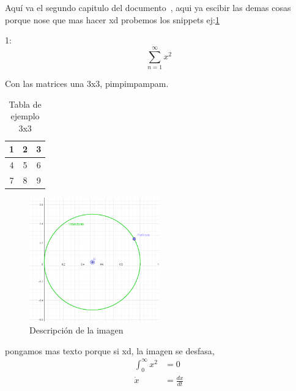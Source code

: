 Aquí va el segundo capitulo del documento~\cite{martin1988estudio}, aqui ya escibir las demas cosas porque nose que mas hacer xd 
probemos los snippets ej:\ref{tab:ejemplo_3x3} 

1:
\begin{equation}
    \sum_{n = 1}^{\infty} x^2 
\end{equation}


Con las matrices una 3x3, pimpimpampam.
\begin{table}[ht]
\centering
\begin{tabular}{|c|c|c|}
\hline
1 & 2 & 3 \\ \hline
4 & 5 & 6 \\ \hline
7 & 8 & 9 \\ \hline
\end{tabular}
\caption{Tabla de ejemplo 3x3}
\label{tab:ejemplo_3x3}
\end{table}

\begin{figure}[H]
\centering
\includegraphics[width=0.5\textwidth]{Imagenes/Captura de pantalla 2024-11-29 113246.png}
\caption{Descripción de la imagen}
\label{fig:ejemplo_imagen}
\end{figure}

pongamos mas texto porque si xd, la imagen se desfasa, 
\begin{align*}
\int_{0}^{\infty} x^2 & = 0\\
\dot{x} & =\frac{dx}{dt} 
\end{align*}
